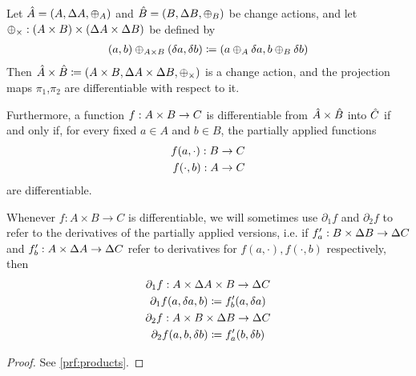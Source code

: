 \begin{prop}[name=Products, restate=products]
  \label{prop:products}
  Let $\hat{A} = (A,\Delta A,\oplus_A)$ and $\hat{B} =
  (B,\Delta B,\oplus_B)$ be change actions,
  and let $\oplus_{\times} : (A \times B) \times (\Delta A \times \Delta B)$ be defined by
  \begin{align*}
    (a, b) \oplus_{A \times B} (\delta a, \delta b) \coloneqq (a \oplus_A \delta a, b \oplus_B \delta b)
  \end{align*}
  Then $\hat{A} \times \hat{B} \coloneqq (A \times B,\Delta A \times
  \Delta B,\oplus_{\times})$ is a change action, and the projection maps $\pi_1$,$\pi_2$
  are differentiable with respect to it.

  Furthermore, a function 
  $f : A \times B \rightarrow C$ is differentiable from $\hat{A} \times \hat{B}$ into $\hat{C}$ if
  and only if, for every fixed $a \in A$ and $b \in B$, the partially applied functions 
  \begin{align*}
    f(a, \cdot) : B \rightarrow C\\
    f(\cdot, b) : A \rightarrow C
  \end{align*}
  are differentiable.
\end{prop}

Whenever $f : A \times B \rightarrow C$ is differentiable, we will sometimes use $\partial_1 f$ and
$\partial_2 f$ to refer to the derivatives of the partially applied versions, i.e. if
$f'_a : B \times \Delta B \rightarrow \Delta C$ and
$f'_b : A \times \Delta A \rightarrow \Delta C$ refer to derivatives for 
$f(a, \cdot), f(\cdot, b)$ respectively, then
\begin{gather*}
  \partial_1 f : A \times \Delta A \times B \rightarrow \Delta C\\
  \partial_1 f(a, \delta a, b) \coloneqq f'_b(a, \delta a)\\
  \partial_2 f : A \times B \times \Delta B \rightarrow \Delta C\\
  \partial_2 f(a, b, \delta b) \coloneqq f'_a(b, \delta b)
\end{gather*}

\ifproofs
\begin{proof}
  See \cref{prf:products}.
\end{proof}
\fi

